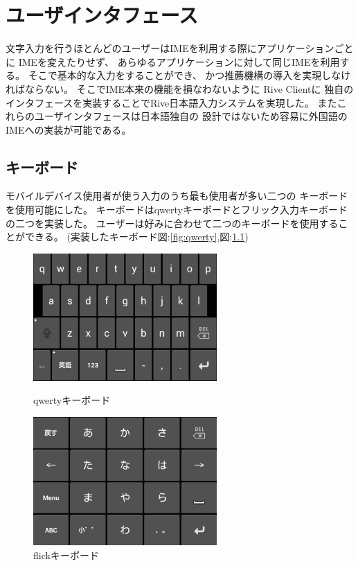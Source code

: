 \chapter{ユーザインタフェース}
\label{chap:userinterface}
文字入力を行うほとんどのユーザーはIMEを利用する際にアプリケーションごとに
IMEを変えたりせず、
あらゆるアプリケーションに対して同じIMEを利用する。
そこで基本的な入力をすることができ、
かつ推薦機構の導入を実現しなければならない。
そこでIME本来の機能を損なわないように
Rive Clientに
独自のインタフェースを実装することでRive日本語入力システムを実現した。
またこれらのユーザインタフェースは日本語独自の
設計ではないため容易に外国語のIMEへの実装が可能である。

\newpage
\section{キーボード}
モバイルデバイス使用者が使う入力のうち最も使用者が多い二つの
キーボードを使用可能にした。
キーボードはqwertyキーボードとフリック入力キーボードの二つを実装した。
ユーザーは好みに合わせて二つのキーボードを使用することができる。
(実装したキーボード図:\ref{fig:qwerty},図:\ref{fig:flick})
\begin{figure}[htbp]
  \begin{minipage}{0.5\hsize}
    \begin{center}
      \includegraphics[width=7cm,bb=0 0 417 290]{images/qwerty.png}
    \end{center}
    \caption{qwertyキーボード}
    \label{fig:qwerty}
  \end{minipage}
  \begin{minipage}{0.5\hsize}
    \begin{center}
      \includegraphics[width=7cm,bb=0 0 415 290]{images/flick.png}
    \end{center}
    \caption{flickキーボード}
    \label{fig:flick}
  \end{minipage}
\end{figure}

